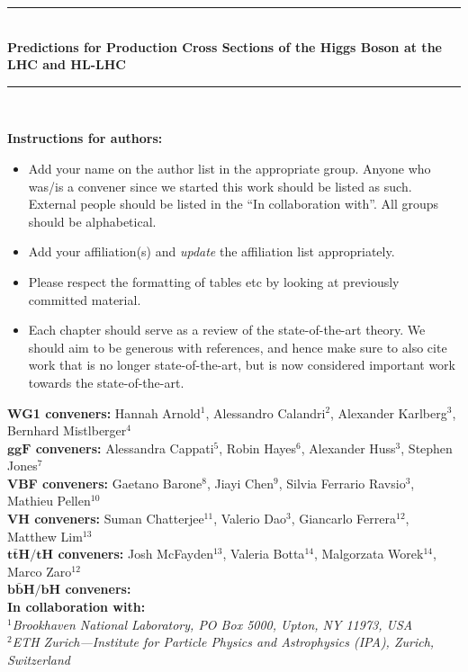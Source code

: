 \documentclass[11pt]{article}
\newcommand{\HRule}{\rule{\linewidth}{0.5mm}}
\begin{document}
\begin{titlepage}
\begin{center}
    \HRule \\[0.9cm]
    \textbf{\Large Predictions for Production Cross Sections of the Higgs Boson at the LHC and HL-LHC} \\[1.0cm]
    \HRule \\[1.5cm]
           {\color{blue} {\bf Instructions for authors:} \begin{itemize} \item Add your name on the author list in the appropriate group. Anyone who was/is a convener since we started this work should be listed as such. External people should be listed in the ``In collaboration with''. All groups should be alphabetical. \item Add your affiliation(s) and \emph{update} the affiliation list appropriately. \item Please respect the formatting of tables etc by looking at previously committed material. \item Each chapter should serve as a review of the state-of-the-art theory. We should aim to be generous with references, and hence make sure to also cite work that is no longer state-of-the-art, but is now considered important work towards the state-of-the-art. \end{itemize}}
	   \textrm{
             {\large {\bf WG1 conveners:} Hannah Arnold$^{1}$, Alessandro Calandri$^{2}$, Alexander Karlberg$^{3}$, Bernhard Mistlberger$^{4}$\\
               {\bf $\boldsymbol{ggF}$ conveners:}  Alessandra Cappati$^{5}$, Robin Hayes$^{6}$, Alexander Huss$^{3}$, Stephen Jones$^{7}$\\
               {\bf VBF conveners:} Gaetano Barone$^{8}$, Jiayi Chen$^{9}$, Silvia Ferrario Ravsio$^{3}$, Mathieu Pellen$^{10}$\\
               {\bf $\boldsymbol{VH}$ conveners:} Suman Chatterjee$^{11}$, Valerio Dao$^{3}$, Giancarlo Ferrera$^{12}$, Matthew Lim$^{13}$\\
               {\bf $\boldsymbol{t\bar{t}H/tH}$ conveners:} Josh McFayden$^{13}$, Valeria Botta$^{14}$, Malgorzata Worek$^{14}$, Marco Zaro$^{12}$\\
               {\bf $\boldsymbol{b\bar{b}H/bH}$ conveners:} \\
               {\bf In collaboration with:} 
           }} \\[0.3cm]	
           \textit{$^{1}$Brookhaven National Laboratory, PO Box 5000, Upton, NY 11973, USA}\\   
           \textit{$^{2}$ETH Zurich—Institute for Particle Physics and Astrophysics (IPA), Zurich, Switzerland}\\

\end{center}
\end{titlepage}
\end{document}
